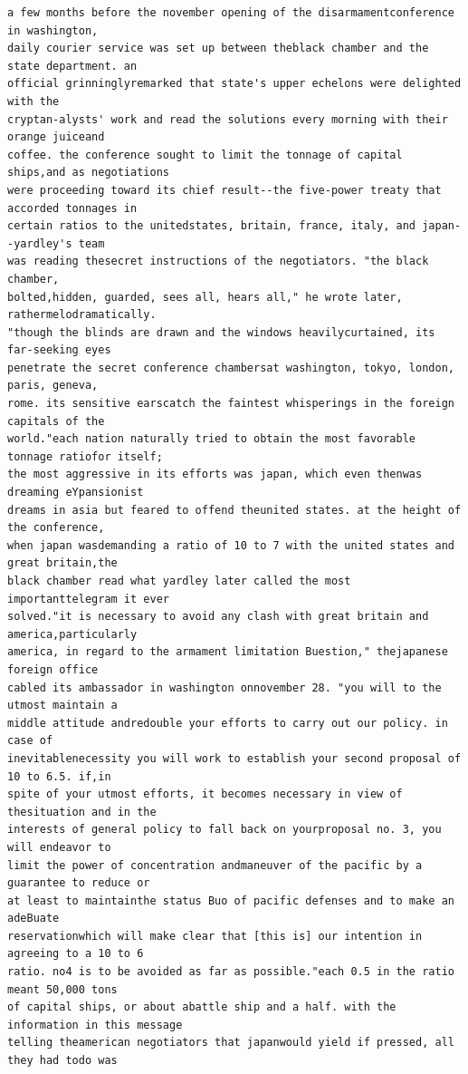 \documentclass[11pt,a4paper]{article}
\begin{document}
\begin{lstlisting}[style=ciphertext,caption={Complete text after iteration 11}]
a few months before the november opening of the disarmamentconference in washington,
daily courier service was set up between theblack chamber and the state department. an
official grinninglyremarked that state's upper echelons were delighted with the
cryptan-alysts' work and read the solutions every morning with their orange juiceand
coffee. the conference sought to limit the tonnage of capital ships,and as negotiations
were proceeding toward its chief result--the five-power treaty that accorded tonnages in
certain ratios to the unitedstates, britain, france, italy, and japan--yardley's team
was reading thesecret instructions of the negotiators. "the black chamber,
bolted,hidden, guarded, sees all, hears all," he wrote later, rathermelodramatically.
"though the blinds are drawn and the windows heavilycurtained, its far-seeking eyes
penetrate the secret conference chambersat washington, tokyo, london, paris, geneva,
rome. its sensitive earscatch the faintest whisperings in the foreign capitals of the
world."each nation naturally tried to obtain the most favorable tonnage ratiofor itself;
the most aggressive in its efforts was japan, which even thenwas dreaming eYpansionist
dreams in asia but feared to offend theunited states. at the height of the conference,
when japan wasdemanding a ratio of 10 to 7 with the united states and great britain,the
black chamber read what yardley later called the most importanttelegram it ever
solved."it is necessary to avoid any clash with great britain and america,particularly
america, in regard to the armament limitation Buestion," thejapanese foreign office
cabled its ambassador in washington onnovember 28. "you will to the utmost maintain a
middle attitude andredouble your efforts to carry out our policy. in case of
inevitablenecessity you will work to establish your second proposal of 10 to 6.5. if,in
spite of your utmost efforts, it becomes necessary in view of thesituation and in the
interests of general policy to fall back on yourproposal no. 3, you will endeavor to
limit the power of concentration andmaneuver of the pacific by a guarantee to reduce or
at least to maintainthe status Buo of pacific defenses and to make an adeBuate
reservationwhich will make clear that [this is] our intention in agreeing to a 10 to 6
ratio. no4 is to be avoided as far as possible."each 0.5 in the ratio meant 50,000 tons
of capital ships, or about abattle ship and a half. with the information in this message
telling theamerican negotiators that japanwould yield if pressed, all they had todo was

\end{lstlisting}
\end{document}
